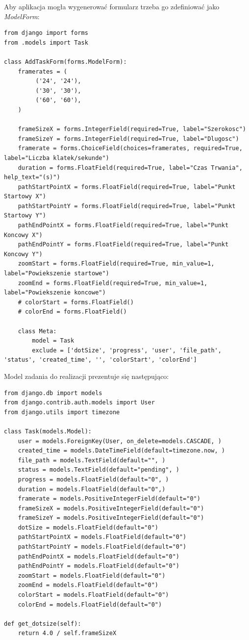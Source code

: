 \documentclass[a4paper]{article}
\begin{document}
Aby aplikacja mogła wygenerować formularz trzeba go zdefiniować jako \textit{ModelForm}:
\begin{lstlisting}
from django import forms
from .models import Task

class AddTaskForm(forms.ModelForm):
    framerates = (
         ('24', '24'),
         ('30', '30'),
         ('60', '60'),
    )

    frameSizeX = forms.IntegerField(required=True, label="Szerokosc")
    frameSizeY = forms.IntegerField(required=True, label="Dlugosc")
    framerate = forms.ChoiceField(choices=framerates, required=True, label="Liczba klatek/sekunde")
    duration = forms.FloatField(required=True, label="Czas Trwania", help_text="(s)")
    pathStartPointX = forms.FloatField(required=True, label="Punkt Startowy X")
    pathStartPointY = forms.FloatField(required=True, label="Punkt Startowy Y")
    pathEndPointX = forms.FloatField(required=True, label="Punkt Koncowy X")
    pathEndPointY = forms.FloatField(required=True, label="Punkt Koncowy Y")
    zoomStart = forms.FloatField(required=True, min_value=1, label="Powiekszenie startowe")
    zoomEnd = forms.FloatField(required=True, min_value=1, label="Powiekszenie koncowe")
    # colorStart = forms.FloatField()
    # colorEnd = forms.FloatField()

    class Meta:
        model = Task
        exclude = ['dotSize', 'progress', 'user', 'file_path', 'status', 'created_time', '', 'colorStart', 'colorEnd']
\end{lstlisting}

Model zadania do realizacji prezentuje się następująco:
\begin{lstlisting}
from django.db import models
from django.contrib.auth.models import User
from django.utils import timezone

class Task(models.Model):
    user = models.ForeignKey(User, on_delete=models.CASCADE, )
    created_time = models.DateTimeField(default=timezone.now, )
    file_path = models.TextField(default="", )
    status = models.TextField(default="pending", )
    progress = models.FloatField(default="0", )
    duration = models.FloatField(default="0",)
    framerate = models.PositiveIntegerField(default="0")
    frameSizeX = models.PositiveIntegerField(default="0")
    frameSizeY = models.PositiveIntegerField(default="0")
    dotSize = models.FloatField(default="0")
    pathStartPointX = models.FloatField(default="0")
    pathStartPointY = models.FloatField(default="0")
    pathEndPointX = models.FloatField(default="0")
    pathEndPointY = models.FloatField(default="0")
    zoomStart = models.FloatField(default="0")
    zoomEnd = models.FloatField(default="0")
    colorStart = models.FloatField(default="0")
    colorEnd = models.FloatField(default="0")

def get_dotsize(self):
    return 4.0 / self.frameSizeX
\end{lstlisting}
\end{document}
